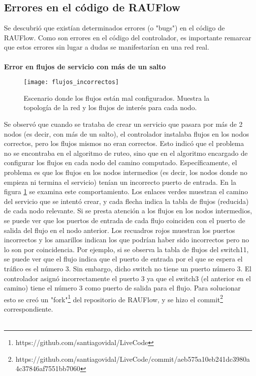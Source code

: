 \subsection{Errores en el código de RAUFlow}
Se descubrió que existían determinados errores (o "bugs") en el código de RAUFlow. Como son errores en el código del controlador, es importante remarcar que estos errores sin lugar a dudas se manifestarían en una red real. \\ \\
\textbf{Error en flujos de servicio con más de un salto} \\
\begin{figure}[t]
	\caption{Escenario donde los flujos están mal configurados. Muestra la topología de la red y los flujos de interés para cada nodo.}
	\texttt{[image: flujos\_incorrectos]}
	\centering
	\label{fig:flujos_incorrectos}
\end{figure}
Se observó que cuando se trataba de crear un servicio que pasara por más de 2 nodos (es decir, con más de un salto), el controlador instalaba flujos en los nodos correctos, pero los flujos mismos no eran correctos. Esto indicó que el problema no se encontraba en el algoritmo de ruteo, sino que en el algoritmo encargado de configurar los flujos en cada nodo del camino computado. Específicamente, el problema es que los flujos en los nodos intermedios (es decir, los nodos donde no empieza ni termina el servicio) tenían un incorrecto puerto de entrada. En la figura \ref{fig:flujos_incorrectos} se examina este comportamiento. Los enlaces verdes muestran el camino del servicio que se intentó crear, y cada flecha indica la tabla de flujos (reducida) de cada nodo relevante. Si se presta atención a los flujos en los nodos intermedios, se puede ver que los puertos de entrada de cada flujo coinciden con el puerto de salida del flujo en el nodo anterior. Los recuadros rojos muestran los puertos incorrectos y los amarillos indican los que podrían haber sido incorrectos pero no lo son por coincidencia. Por ejemplo, si se observa la tabla de flujos del switch11, se puede ver que el flujo indica que el puerto de entrada por el que se espera el tráfico es el número 3. Sin embargo, dicho switch no tiene un puerto número 3. El controlador asignó incorrectamente el puerto 3 ya que el switch3 (el anterior en el camino) tiene el número 3 como puerto de salida para el flujo.
Para solucionar esto se creó un "fork"\footnote{https://github.com/santiagovidal/LiveCode} del repositorio de RAUFlow, y se hizo el commit\footnote{https://github.com/santiagovidal/LiveCode/commit/aeb575a10eb241dc3980a4c37846af7551bb7060} correspondiente. \\ \\
